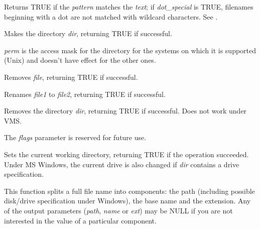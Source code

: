 
Returns TRUE if the {\it pattern}\/ matches the {\it text}\/; if {\it
dot\_special}\/ is TRUE, filenames beginning with a dot are not matched
with wildcard characters. See .



Makes the directory {\it dir}, returning TRUE if successful.

{\it perm} is the access mask for the directory for the systems on which it is
supported (Unix) and doesn't have effect for the other ones.



Removes {\it file}, returning TRUE if successful.



Renames {\it file1} to {\it file2}, returning TRUE if successful.



Removes the directory {\it dir}, returning TRUE if successful. Does not work under VMS.

The {\it flags} parameter is reserved for future use.



Sets the current working directory, returning TRUE if the operation succeeded.
Under MS Windows, the current drive is also changed if {\it dir} contains a drive specification.

\label{wxsplitfunction}


This function splits a full file name into components: the path (including possible disk/drive
specification under Windows), the base name and the extension. Any of the output parameters
({\it path}, {\it name} or {\it ext}) may be NULL if you are not interested in the value of
a particular component.

